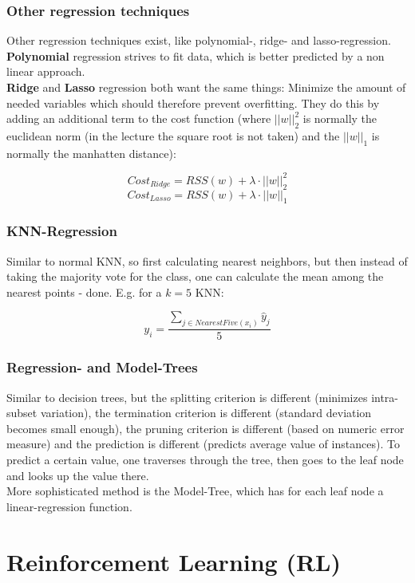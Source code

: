 \documentclass[12pt,a4paper]{article}
\begin{document}
\subsubsection{Other regression techniques}

\noindent Other regression techniques exist, like polynomial-, ridge- and lasso-regression.\\
\textbf{Polynomial} regression strives to fit data, which is better predicted by a non linear approach.\\[1em]
\textbf{Ridge} and \textbf{Lasso} regression both want the same things: Minimize the amount of needed variables which should therefore prevent overfitting. They do this by adding an additional term to the cost function (where \(||w||_2^2\) is normally the euclidean norm (in the lecture the square root is not taken) and the \(||w||_1\) is normally the manhatten distance):

\[Cost_{Ridge} = RSS(w) + \lambda \cdot ||w||_2^2\]
\[Cost_{Lasso} = RSS(w) + \lambda \cdot ||w||_1\]

\subsubsection{KNN-Regression}

\noindent Similar to normal KNN, so first calculating nearest neighbors, but then instead of taking the majority vote for the class, one can calculate the mean among the nearest points - done. E.g. for a \(k=5\) KNN:

\[y_i = \frac{\sum_{j \in NearestFive(x_i)} \hat{y}_j}{5}\]

\subsubsection{Regression- and Model-Trees}

\noindent Similar to decision trees, but the splitting criterion is different (minimizes intra-subset variation), the termination criterion is different (standard deviation becomes small enough), the pruning criterion is different (based on numeric error measure) and the prediction is different (predicts average value of instances). To predict a certain value, one traverses through the tree, then goes to the leaf node and looks up the value there.\\
More sophisticated method is the Model-Tree, which has for each leaf node a linear-regression function.

\newpage
\section{Reinforcement Learning (RL)}
\end{document}

